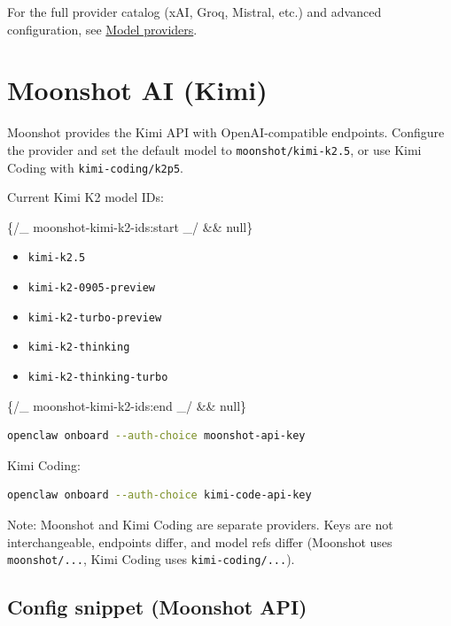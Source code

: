 For the full provider catalog (xAI, Groq, Mistral, etc.) and advanced configuration,
see \href{/concepts/model-providers}{Model providers}.


\clearpage

\section{Moonshot AI (Kimi)}


Moonshot provides the Kimi API with OpenAI-compatible endpoints. Configure the
provider and set the default model to \texttt{moonshot/kimi-k2.5}, or use
Kimi Coding with \texttt{kimi-coding/k2p5}.

Current Kimi K2 model IDs:


\{/\_ moonshot-kimi-k2-ids:start \_/ \&\& null\}


\begin{itemize}
  \item \texttt{kimi-k2.5}
  \item \texttt{kimi-k2-0905-preview}
  \item \texttt{kimi-k2-turbo-preview}
  \item \texttt{kimi-k2-thinking}
  \item \texttt{kimi-k2-thinking-turbo}
\end{itemize}

\{/\_ moonshot-kimi-k2-ids:end \_/ \&\& null\}

\begin{lstlisting}[language=bash]
openclaw onboard --auth-choice moonshot-api-key
\end{lstlisting}


Kimi Coding:

\begin{lstlisting}[language=bash]
openclaw onboard --auth-choice kimi-code-api-key
\end{lstlisting}


Note: Moonshot and Kimi Coding are separate providers. Keys are not interchangeable, endpoints differ, and model refs differ (Moonshot uses \texttt{moonshot/...}, Kimi Coding uses \texttt{kimi-coding/...}).

\subsection{Config snippet (Moonshot API)}


